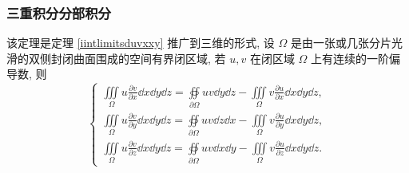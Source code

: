 \subsubsection{三重积分分部积分}

\begin{theorem}[三重积分分部积分公式]
    该定理是定理 \ref{iintlimitsduvxxy} 推广到三维的形式, 设 $\Omega$ 是由一张或几张分片光滑的双侧封闭曲面围成的空间有界闭区域, 若 $u,v$ 在闭区域 $\Omega$ 上有连续的一阶偏导数, 则
    $$\begin{cases}
            \displaystyle\iiint\limits_\Omega u\frac{\partial v}{\partial x}\dd x\dd y\dd z=\oiint\limits_{\partial \Omega}uv\dd y\dd z-\iiint\limits_\Omega v\frac{\partial u}{\partial x}\dd x\dd y\dd z, \\[6pt]
            \displaystyle\iiint\limits_\Omega u\frac{\partial v}{\partial y}\dd x\dd y\dd z=\oiint\limits_{\partial \Omega}uv\dd z\dd x-\iiint\limits_\Omega v\frac{\partial u}{\partial y}\dd x\dd y\dd z, \\[6pt]
            \displaystyle\iiint\limits_\Omega u\frac{\partial v}{\partial z}\dd x\dd y\dd z=\oiint\limits_{\partial \Omega}uv\dd x\dd y-\iiint\limits_\Omega v\frac{\partial u}{\partial z}\dd x\dd y\dd z.
        \end{cases}$$
\end{theorem}

